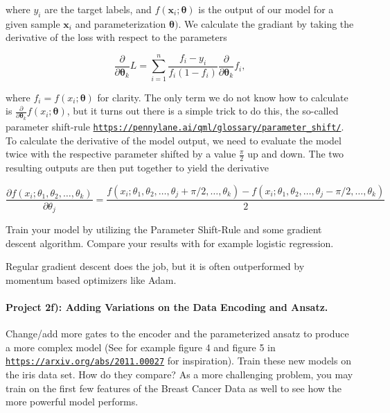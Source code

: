 \documentclass[%
oneside,                 %
final,                   %
10pt]{article}
\begin{document}
where $y_i$ are the target labels, and
$f(\boldsymbol{x}_i;\boldsymbol{\theta})$ is the output of our model
for a given sample $\boldsymbol{x}_i$ and parameterization
$\boldsymbol{\theta})$. We calculate the gradiant by taking the
derivative of the loss with respect to the parameters

\begin{equation*}
    \frac{\partial}{\partial \boldsymbol{\theta}_k}L = \sum_{i=1}^{n}{\frac{f_i - y_i}{f_i(1 - f_i)}} \frac{\partial}{\partial \boldsymbol{\theta}_k}f_i,
\end{equation*}

where $f_i = f(x_i;\boldsymbol{\theta})$ for clarity. The only term we do not know how to calculate is $\frac{\partial}{\partial \boldsymbol{\theta}_k}f(x_i;\boldsymbol{\theta})$, but it turns out there is a simple trick to do this, the so-called parameter shift-rule \href{{https://pennylane.ai/qml/glossary/parameter_shift/}}{\nolinkurl{https://pennylane.ai/qml/glossary/parameter_shift/}}. To calculate the derivative of the model output, we need to evaluate the model twice with the respective parameter shifted by a value $\frac{\pi}{2}$ up and down. The two resulting outputs are then put together to yield the derivative

\begin{equation*}
    \frac{\partial f(x_i; \theta_1, \theta_2, \dots, \theta_k)}{\partial \theta_j}  = \frac{f(x_i; \theta_1, \theta_2, \dots, \theta_j + \pi /2, \dots, \theta_k) -f(x_i; \theta_1, \theta_2, \dots, \theta_j - \pi /2, \dots, \theta_k)}{2}
\end{equation*}

Train your model by utilizing the Parameter Shift-Rule and some
gradient descent algorithm. Compare your results with for example
logistic regression.

Regular gradient descent does the job, but it is often outperformed by momentum based optimizers like Adam.

\paragraph{Project 2f): Adding Variations on the Data Encoding and Ansatz.}
Change/add more gates to the encoder and the parameterized ansatz to produce a more complex model (See for example figure 4 and figure 5 in \href{{https://arxiv.org/abs/2011.00027}}{\nolinkurl{https://arxiv.org/abs/2011.00027}} for inspiration). Train these new models on the iris data set. How do they compare? As a more challenging problem, you may train on the first few features of the Breast Cancer Data as well to see how the more powerful model performs.
\end{document}
